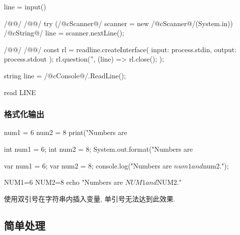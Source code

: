 \documentclass[hidelinks]{ctexart}
\begin{document}
\begin{pylst}
line = input()
\end{pylst}
\begin{javalst}
/@@/
/@\lhend @/
try (/@\+c{Scanner}@/ scanner = new /@\+c{Scanner}@/(System.in)) {
    /@\+c{String}@/ line = scanner.nextLine();
}
\end{javalst}
\begin{nodejslst}
/@@/
/@\lhend @/
const rl = readline.createInterface({
    input: process.stdin,
    output: process.stdout
});
rl.question('', (line) => {
    rl.close();
});

\end{nodejslst}
\begin{cshlst}
string line = /@\+c{Console}@/.ReadLine();
\end{cshlst}
\begin{shlst}
read LINE
\end{shlst}


\subsubsection{格式化输出} %
\label{ssub:格式化输出}

\begin{pylst}
num1 = 6
num2 = 8
print("Numbers are %
\end{pylst}
\begin{javalst}
int num1 = 6;
int num2 = 8;
System.out.format("Numbers are %
\end{javalst}
\begin{jslst}
var num1 = 6;
var num2 = 8;
console.log("Numbers are ${num1} and ${num2}.");
\end{jslst}
\begin{shlst}
NUM1=6
NUM2=8
echo "Numbers are $NUM1 and $NUM2."
\end{shlst}
{\shname} 使用双引号在字符串内插入变量, 单引号无法达到此效果.



\subsection{简单处理} %
\label{sub:简单处理}
\end{document}

